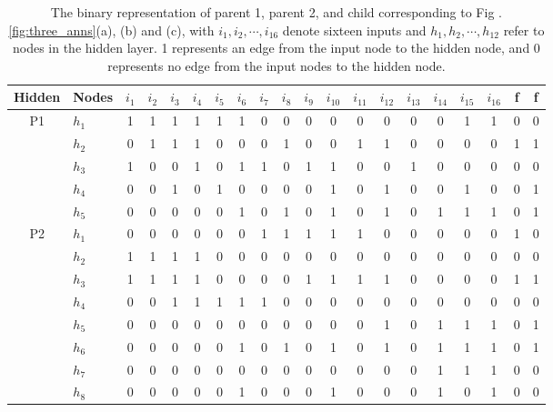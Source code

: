 \documentclass[letterpaper]{IEEEtran}
\begin{document}
\begin{table}[!t]
		\centering
		\caption{The binary representation of parent 1, parent 2, and child
			corresponding to Fig .\ref{fig:three_anns}(a), (b) and (c), with
			$i_1,i_2,\cdots, i_{16}$ denote sixteen inputs and $h_1,h_2,
			\cdots, h_{12}$ refer to nodes in the hidden layer. 1 represents an
			edge from the input node to the hidden node, and 0 represents no
			edge from the input nodes to the hidden node.}
		\label{tab:binary-rep}
		\begin{adjustbox}{width=0.9\textwidth}
		\begin{tabular}{cl|cccc cccc cccc cccc | cc}
			\toprule
			Hidden & Nodes  & $i_1$ & $i_2$ & $i_3$ & $i_4$ & $i_5$ & $i_6$ & $i_7$ & $i_8$ & $i_9$ & $i_{10}$ & $i_{11}$ & $i_{12}$ & $i_{13}$ & $i_{14}$ & $i								_{15}$ & $i_{16}$ & f & f\\
			\midrule
			\multirow{5}{*}{P1}		
				   &	$h_1$ & 1  & 1 & 1  & 1  & 1 & 1 & 0 & 0  & 0 & 0 & 0 & 0  & 0 & 0  & 1 & 1 & 0 & 0\\
				&	$h_2$ & 0  & 1 & 1  & 1  & 0 & 0 & 0 & 1  & 0 & 0 & 1 & 1  & 0 & 0  & 0 & 0 & 1 & 1\\
				&	$h_3$ & 1  & 0 & 0  & 1  & 0 & 1 & 1 & 0  & 1 & 1 & 0 & 0  & 1 & 0  & 0 & 0 & 0 & 0\\
				&	$h_4$ & 0  & 0 & 1  & 0  & 1 & 0 & 0 & 0  & 0 & 1 & 0 & 1  & 0 & 0  & 1 & 0 & 0 & 1\\
				&	$h_5$ & 0  & 0 & 0  & 0  & 0 & 1 & 0 & 1  & 0 & 1 & 0 & 1  & 0 & 1  & 1 & 1 & 0 & 1\\
			\midrule
			\multirow{12}{*}{P2}	
				&	$h_1$ & 0  & 0 & 0  & 0  & 0 & 0 & 1 & 1  & 1 & 1	 & 1 & 0  & 0 & 0  & 0 & 0 & 1 & 0\\
				&	$h_2$ & 1  & 1 & 1  & 1  & 0 & 0 & 0 & 0  & 0 & 0	 & 0 & 0  & 0 & 0  & 0 & 0 & 0 & 0\\
				&	$h_3$ & 1  & 1 & 1  & 1  & 0 & 0 & 0 & 0  & 1 & 1	 & 1 & 1  & 0 & 0  & 0 & 0 & 1 & 1\\
				&	$h_4$ & 0  & 0 & 1  & 1  & 1 & 1 & 1 & 0  & 0 & 0	 & 0 & 0  & 0 & 0  & 0 & 0 & 0 & 0\\
				&	$h_5$ & 0  & 0 & 0  & 0  & 0 & 0 & 0 & 0  & 0 & 0	 & 0 & 1  & 0 & 1  & 1 & 1 & 0 & 1\\
				&	$h_6$ & 0  & 0 & 0  & 0  & 0 & 1 & 0 & 1  & 0 & 1	 & 0 & 1  & 0 & 1  & 1 & 1 & 0 & 1\\
				&	$h_7$ & 0  & 0 & 0  & 0  & 0 & 0 & 0 & 0  & 0 & 0	 & 0 & 0  & 0 & 1  & 1 & 1 & 0 & 0\\
				&	$h_8$ & 0  & 0 & 0  & 0  & 0 & 1 & 0 & 0  & 0 & 1	 & 0 & 0  & 0 & 1  & 0 & 1 & 0 & 0\\

\end{tabular}
\end{adjustbox}
\end{table}
\end{document}
